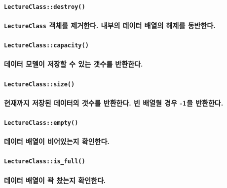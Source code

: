 \documentclass[UTF8]{report}
\begin{document}
            \paragraph{\texttt{LectureClass::destroy()}}
            \paragraph{%
                \normalfont \texttt{LectureClass} 객체를 제거한다. 내부의 데이터 배열의 해제를 동반한다.
            }

            \paragraph{\texttt{LectureClass::capacity()}}
            \paragraph{%
                \normalfont 데이터 모델이 저장할 수 있는 갯수를 반환한다.
            }

            \paragraph{\texttt{LectureClass::size()}}
            \paragraph{%
                \normalfont 현재까지 저장된 데이터의 갯수를 반환한다. 빈 배열읠 경우 -1을 반환한다.
            }

            \paragraph{\texttt{LectureClass::empty()}}
            \paragraph{%
                \normalfont 데이터 배열이 비어있는지 확인한다.
            }

            \paragraph{\texttt{LectureClass::is\_full()}}
            \paragraph{%
                \normalfont 데이터 배열이 꽉 찼는지 확인한다.
            }
\end{document}
